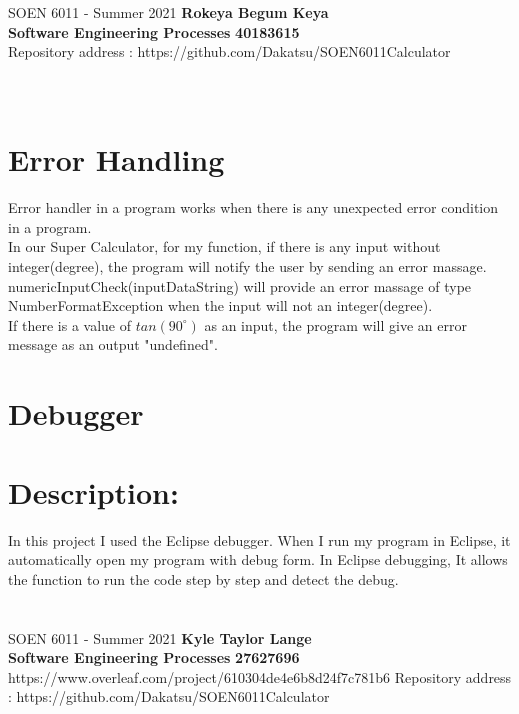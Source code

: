 \documentclass[a4paper, 11pt]{report}
\begin{document}
\section*{}
\normalsize {SOEN 6011 - Summer 2021} \hfill \textbf{Rokeya Begum Keya} \\
\textbf{ Software Engineering Processes}  \hfill \textbf{40183615} \\
\hfill Repository address : https://github.com/Dakatsu/SOEN6011Calculator
\\\\\\
\section*{Error Handling}
Error handler in a program works when there is any unexpected error condition in a program.
\newline \\
In our Super Calculator, for my function, if there is any input without integer(degree), the program will notify the user by sending an error massage. 
\newline\\
numericInputCheck(inputDataString)  will provide an error massage of type NumberFormatException when the input will not an integer(degree).
\newline  \\
If there is a value of $tan(90^\circ)$ as an input, the program will give an error message as an output "undefined".
\\
\section*{Debugger}
   \section*{Description:}
In this project I used the Eclipse debugger. When I run my program in Eclipse, it automatically open my program with debug form. In Eclipse debugging, It allows the function to run the code step by step and detect the debug.  \\
\pagebreak

\section*{}
\normalsize {SOEN 6011 - Summer 2021} \hfill \textbf{Kyle Taylor Lange} \\
\textbf{ Software Engineering Processes}  \hfill \textbf{27627696} \\https://www.overleaf.com/project/610304de4e6b8d24f7c781b6
\hfill Repository address : https://github.com/Dakatsu/SOEN6011Calculator
\end{document}
